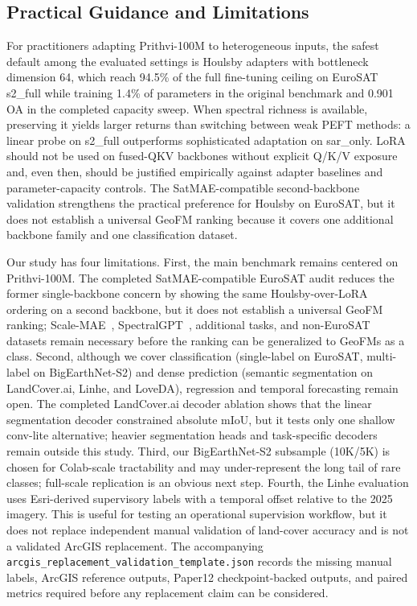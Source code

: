 \subsection{Practical Guidance and Limitations}
For practitioners adapting Prithvi-100M to heterogeneous inputs, the safest default among the evaluated settings is Houlsby adapters with bottleneck dimension 64, which reach 94.5\% of the full fine-tuning ceiling on EuroSAT s2\_full while training 1.4\% of parameters in the original benchmark and 0.901 OA in the completed capacity sweep. When spectral richness is available, preserving it yields larger returns than switching between weak PEFT methods: a linear probe on s2\_full outperforms sophisticated adaptation on sar\_only. LoRA should not be used on fused-QKV backbones without explicit Q/K/V exposure and, even then, should be justified empirically against adapter baselines and parameter-capacity controls. The SatMAE-compatible second-backbone validation strengthens the practical preference for Houlsby on EuroSAT, but it does not establish a universal GeoFM ranking because it covers one additional backbone family and one classification dataset.

Our study has four limitations. First, the main benchmark remains centered on Prithvi-100M. The completed SatMAE-compatible EuroSAT audit reduces the former single-backbone concern by showing the same Houlsby-over-LoRA ordering on a second backbone, but it does not establish a universal GeoFM ranking; Scale-MAE~\cite{reed2023scalemae}, SpectralGPT~\cite{hong2024spectralgpt}, additional tasks, and non-EuroSAT datasets remain necessary before the ranking can be generalized to GeoFMs as a class. Second, although we cover classification (single-label on EuroSAT, multi-label on BigEarthNet-S2) and dense prediction (semantic segmentation on LandCover.ai, Linhe, and LoveDA), regression and temporal forecasting remain open. The completed LandCover.ai decoder ablation shows that the linear segmentation decoder constrained absolute mIoU, but it tests only one shallow conv-lite alternative; heavier segmentation heads and task-specific decoders remain outside this study. Third, our BigEarthNet-S2 subsample (10K/5K) is chosen for Colab-scale tractability and may under-represent the long tail of rare classes; full-scale replication is an obvious next step. Fourth, the Linhe evaluation uses Esri-derived supervisory labels with a temporal offset relative to the 2025 imagery. This is useful for testing an operational supervision workflow, but it does not replace independent manual validation of land-cover accuracy and is not a validated ArcGIS replacement. The accompanying \texttt{arcgis\_replacement\_validation\_template.json} records the missing manual labels, ArcGIS reference outputs, Paper12 checkpoint-backed outputs, and paired metrics required before any replacement claim can be considered.

